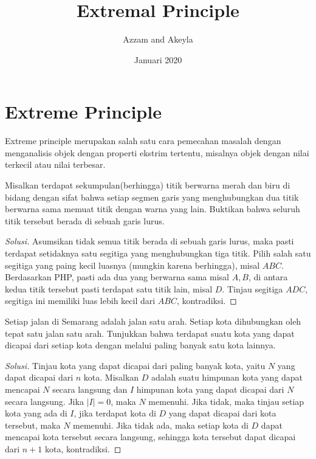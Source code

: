 \documentclass[11pt]{scrartcl}
\title{Extremal Principle}
\author{Azzam and Akeyla}
\date{Januari 2020}
\begin{document}
\maketitle

\renewcommand*\contentsname{Daftar Isi}
\tableofcontents

\newpage

\section{Extreme Principle}
Extreme principle merupakan salah satu cara pemecahan masalah dengan menganalisis objek dengan properti ekstrim tertentu, misalnya objek dengan nilai terkecil atau nilai terbesar.

\begin{example}
    Misalkan terdapat sekumpulan(berhingga) titik berwarna merah dan biru di bidang dengan sifat bahwa setiap segmen garis yang menghubungkan dua titik berwarna sama memuat titik dengan warna yang lain. Buktikan bahwa seluruh titik tersebut berada di sebuah garis lurus.
\end{example}

\begin{proof}[Solusi]
    Asumsikan tidak semua titik berada di sebuah garis lurus, maka pasti terdapat setidaknya satu segitiga yang menghubungkan tiga titik. Pilih salah satu segitiga yang paing kecil luasnya (mungkin karena berhingga), misal $ABC$. Berdasarkan PHP, pasti ada dua yang berwarna sama misal $A,B$, di antara kedua titik tersebut pasti terdapat satu titik lain, misal $D$. Tinjau segitiga $ADC$, segitiga ini memiliki luas lebih kecil dari $ABC$, kontradiksi.
\end{proof}

\begin{example}
    Setiap jalan di Semarang adalah jalan satu arah. Setiap kota dihubungkan oleh tepat satu jalan satu arah. Tunjukkan bahwa terdapat suatu kota yang dapat dicapai dari setiap kota dengan melalui paling banyak satu kota lainnya.
\end{example}

\begin{proof}[Solusi]
    Tinjau kota yang dapat dicapai dari paling banyak kota, yaitu $N$ yang dapat dicapai dari $n$ kota. Misalkan $D$ adalah suatu himpunan kota yang dapat mencapai $N$ secara langsung dan $I$ himpunan kota yang dapat dicapai dari $N$ secara langsung. Jika $|I| = 0$, maka $N$ memenuhi. Jika tidak, maka tinjau setiap kota yang ada di $I$, jika terdapat kota di $D$ yang dapat dicapai dari kota tersebut, maka $N$ memenuhi. Jika tidak ada, maka setiap kota di $D$ dapat mencapai kota tersebut secara langsung, sehingga kota tersebut dapat dicapai dari $n + 1$ kota, kontradiksi.
\end{proof}
\end{document}
